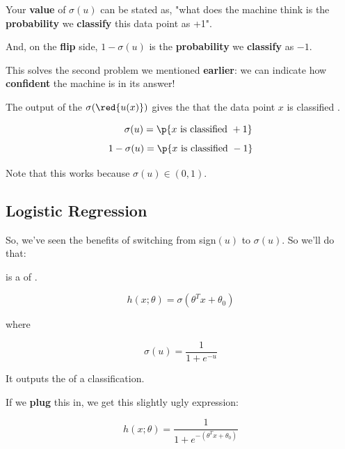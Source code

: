         Your \textbf{value} of $\sigma(u)$ can be stated as, "what does the machine think is the \textbf{probability} we \textbf{classify} this data point as +1".
        
        And, on the \textbf{flip} side, $1-\sigma(u)$ is the \textbf{probability} we \textbf{classify} as $-1$.
        
        This solves the second problem we mentioned \textbf{earlier}: we can indicate how \textbf{confident} the machine is in its answer!\\
        
        \begin{concept}
            The output of the  $\sigma(\red{u(x)})$ gives the  that the data point $x$ is classified .
            
            \begin{equation*}
                \quad \;\; \sigma(u) = \p{ x\text{ is classified }+1 }
            \end{equation*}
            \begin{equation*}
                1 - \sigma(u) = \p{ x\text{ is classified }-1 }
            \end{equation*}
            
            Note that this works because $\sigma(u) \in (0,1)$.
        \end{concept}
        
    \subsection*{Logistic Regression}
    
        So, we've seen the benefits of switching from sign$(u)$ to $\sigma(u)$. So we'll do that:
            \\
        
        
        \begin{kequation}
             is a  of .
            
            \begin{equation*}
                h(x; \theta) = \sigma(\theta^T x + \theta_0 )
            \end{equation*}
        
            \centerline{where}
            
            \begin{equation*}
                \sigma(u) = \frac{1}{1+e^{-u}}
            \end{equation*}
            
            It outputs the  of a  classification.
        \end{kequation}
        
        If we \textbf{plug} this in, we get this slightly ugly expression:
        
        \begin{equation*}
            h(x; \theta) = \frac{1}{1+e^{-(\theta^T x + \theta_0) } }
        \end{equation*}
        